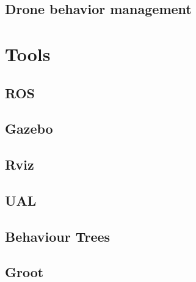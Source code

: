 



\subsection{Drone behavior management}
\label{subsec:DroneBehaviorManagement}


\section{Tools}
\label{sec:PreviousStudy}

\subsection{ROS}
\label{subsec:ROS}

\subsection{Gazebo}
\label{subsec:Gazebo}

\subsection{Rviz}
\label{subsec:Rviz}

\subsection{UAL}
\label{subsec:UAL}

\subsection{Behaviour Trees}
\label{subsec:BehaviourTrees}

\subsection{Groot}
\label{subsec:Groot}



\endinput